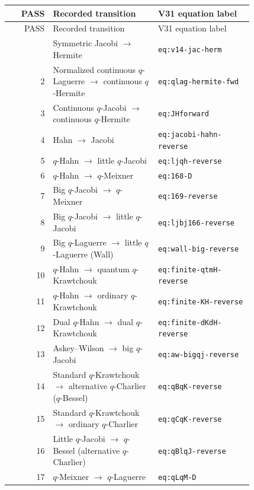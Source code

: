 \documentclass[11pt]{article}
\begin{document}
\begin{center}\small
\begin{longtable}{@{}r p{0.43\linewidth} p{0.39\linewidth}@{}}
\toprule PASS & Recorded transition & V31 equation label \\
\midrule\endfirsthead
\toprule PASS & Recorded transition & V31 equation label \\
\midrule\endhead
\bottomrule\endfoot
1 & Symmetric Jacobi $\ensuremath{\to}$ Hermite & \texttt{eq:v14-jac-herm} \\
2 & Normalized continuous $q$-Laguerre $\ensuremath{\to}$ continuous $q$-Hermite & \texttt{eq:qlag-hermite-fwd} \\
3 & Continuous $q$-Jacobi $\ensuremath{\to}$ continuous $q$-Hermite & \texttt{eq:JHforward} \\
4 & Hahn $\ensuremath{\to}$ Jacobi & \texttt{eq:jacobi-hahn-reverse} \\
5 & $q$-Hahn $\ensuremath{\to}$ little $q$-Jacobi & \texttt{eq:ljqh-reverse} \\
6 & $q$-Hahn $\ensuremath{\to}$ $q$-Meixner & \texttt{eq:168-D} \\
7 & Big $q$-Jacobi $\ensuremath{\to}$ $q$-Meixner & \texttt{eq:169-reverse} \\
8 & Big $q$-Jacobi $\ensuremath{\to}$ little $q$-Jacobi & \texttt{eq:ljbj166-reverse} \\
9 & Big $q$-Laguerre $\ensuremath{\to}$ little $q$-Laguerre (Wall) & \texttt{eq:wall-big-reverse} \\
10 & $q$-Hahn $\ensuremath{\to}$ quantum $q$-Krawtchouk & \texttt{eq:finite-qtmH-reverse} \\
11 & $q$-Hahn $\ensuremath{\to}$ ordinary $q$-Krawtchouk & \texttt{eq:finite-KH-reverse} \\
12 & Dual $q$-Hahn $\ensuremath{\to}$ dual $q$-Krawtchouk & \texttt{eq:finite-dKdH-reverse} \\
13 & Askey--Wilson $\ensuremath{\to}$ big $q$-Jacobi & \texttt{eq:aw-bigqj-reverse} \\
14 & Standard $q$-Krawtchouk $\ensuremath{\to}$ alternative $q$-Charlier ($q$-Bessel) & \texttt{eq:qBqK-reverse} \\
15 & Standard $q$-Krawtchouk $\ensuremath{\to}$ ordinary $q$-Charlier & \texttt{eq:qCqK-reverse} \\
16 & Little $q$-Jacobi $\ensuremath{\to}$ $q$-Bessel (alternative $q$-Charlier) & \texttt{eq:qBlqJ-reverse} \\
17 & $q$-Meixner $\ensuremath{\to}$ $q$-Laguerre & \texttt{eq:qLqM-D} \\

\end{longtable}
\end{center}
\end{document}
